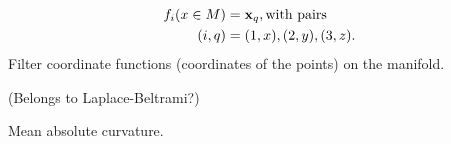 \begin{compactdesc}
\begin{align*}
			f_i(x\in M)&=\bm{\mathrm{x}}_{q},\text{with pairs}\\
			(i,q)&=(1,x),(2,y),(3,z).
		\end{align*}
		Filter coordinate functions (coordinates of the points) on the manifold.
\item[\lp{Compression \& Simplification}] (Belongs to Laplace-Beltrami?)
\item[\lp{Differential properties}] Mean absolute curvature.
\item[\lp{Segmentation}]
\item[\lp{Symmetry and structure detection}]
\item[\lp{Saliency}]
\item[\lp{Feature extraction}]
\end{compactdesc}
